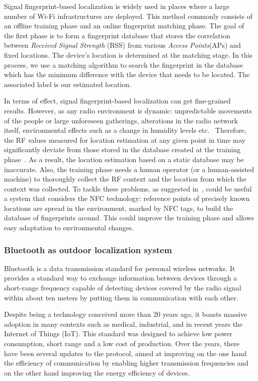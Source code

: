 Signal fingerprint-based localization is widely used in places where a large number of Wi-Fi infrastructures are deployed. This method commonly
consists of an offline training phase and an online fingerprint matching phase. The goal of the first phase is to form a fingerprint database that
stores the correlation between \textit{Received Signal Strength} (RSS) from various \textit{Access Points}(APs) and fixed locations. The device's
location is determined at the matching stage. In this process, we use a matching algorithm to search the fingerprint in the database which has the
minimum difference with the device that needs to be located. The associated label is our estimated location.

In terms of effect, signal fingerprint-based localization can get fine-grained results. However, as any radio environment is dynamic: unpredictable
movements of the people or large unforeseen gatherings, alterations in the radio network itself, environmental effects such as a change in humidity
levels etc.~\cite{chaudhry2013indoor} Therefore, the RF values measured for location estimation at any given point in time may significantly deviate
from those stored in the database created at the training phase~\cite{chaudhry2013indoor}. As a result, the location estimation based on a static
database may be inaccurate. Also, the training phase needs a human operator (or a human-assisted machine) to thoroughly collect the RF context and
the location from which the context was collected. To tackle these problems, as suggested in~\cite{chaudhry2013indoor}, could be useful a system that
considers the NFC technology: reference points of precisely known locations are spread in the environment, marked by NFC tags, to build the database
of fingerprints around. This could improve the training phase and allows easy adaptation to environmental changes.

\subsubsection{Bluetooth as outdoor localization system}
Bluetooth is a data transmission standard for personal wireless networks. It provides a standard way to exchange information between devices through
a short-range frequency capable of detecting devices covered by the radio signal within about ten meters by putting them in communication with each
other.

Despite being a technology conceived more than 20 years ago, it boasts massive adoption in many contexts such as medical, industrial, and in recent
years the Internet of Things (IoT). This standard was designed to achieve low power consumption, short range and a low cost of production. Over the
years, there have been several updates to the protocol, aimed at improving on the one hand the efficiency of communication by enabling higher
transmission frequencies and on the other hand improving the energy efficiency of devices.

